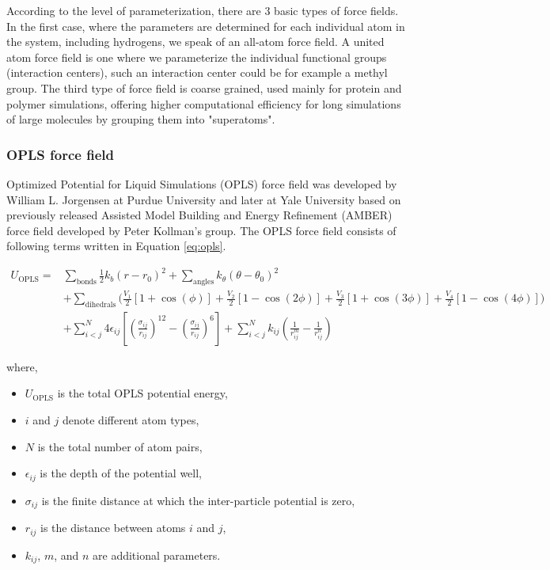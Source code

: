 According to the level of parameterization, there are 3 basic types of force fields. In the first case, where the parameters are determined for each individual atom in the system, including hydrogens, we speak of an all-atom force field. A united atom force field is one where we parameterize the individual functional groups (interaction centers), such an interaction center could be for example a methyl group. The third type of force field is coarse grained, used mainly for protein and polymer simulations, offering higher computational efficiency for long simulations of large molecules by grouping them into "superatoms". \cite{da_silva_are_2020}

\subsubsection{OPLS force field}

Optimized Potential for Liquid Simulations (OPLS) force field was developed by William L. Jorgensen \cite{jorgensen_opls_1988} at Purdue University and later at Yale University based on previously released Assisted Model Building and Energy Refinement (AMBER) force field developed by Peter Kollman's group. \cite{cornell_second_1995} The OPLS force field consists of following terms written in Equation \ref{eq:opls}. 
	
	\begin{equation}
		\begin{aligned}
			U_{\text{OPLS}} = & \sum_{\text{bonds}} \frac{1}{2} k_b(r-r_0)^2 + \sum_{\text{angles}} k_{\theta} (\theta-\theta_0)^2 \\
			& + \sum_{\text{dihedrals}} \Biggl( \frac {V_1} {2} \left [ 1 + \cos (\phi) \right ] + \frac {V_2} {2} \left [ 1 - \cos (2\phi) \right ] 
			+ \frac {V_3} {2} \left [ 1 + \cos (3\phi) \right ] + \frac {V_4} {2} \left [ 1 - \cos (4\phi) \right ] \Biggr) \\
			& + \sum_{i<j}^N 4\epsilon_{ij} \left[ \left( \frac{\sigma_{ij}}{r_{ij}} \right)^{12} - \left( \frac{\sigma_{ij}}{r_{ij}} \right)^6 \right] + \sum_{i<j}^N k_{ij} \left( \frac{1}{r_{ij}^m} - \frac{1}{r_{ij}^n} \right)
		\end{aligned}
		\label{eq:opls}
	\end{equation}
	
	where,
	\begin{itemize}
		\item $U_{\text{OPLS}}$ is the total OPLS potential energy,
		\item $i$ and $j$ denote different atom types,
		\item $N$ is the total number of atom pairs,
		\item $\epsilon_{ij}$ is the depth of the potential well,
		\item $\sigma_{ij}$ is the finite distance at which the inter-particle potential is zero,
		\item $r_{ij}$ is the distance between atoms $i$ and $j$,
		\item $k_{ij}$, $m$, and $n$ are additional parameters.
	\end{itemize}
	
